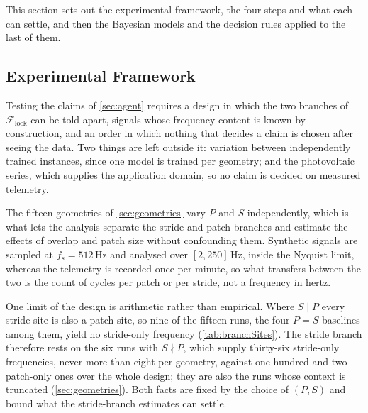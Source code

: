 This section sets out the experimental framework, the four steps and what each can settle, and then the Bayesian models and the decision rules applied to the last of them.

\subsection{Experimental Framework}\label{sec:framework}
\begingroup
\let\subsubsection\paragraph%
\let\subsection\subsubsection%
Testing the claims of \autoref{sec:agent} requires a design in which the two branches of $\mathcal F_{\mathrm{lock}}$ can be told apart, signals whose frequency content is known by construction, and an order in which nothing that decides a claim is chosen after seeing the data. Two things are left outside it: variation between independently trained instances, since one model is trained per geometry; and the photovoltaic series, which supplies the application domain, so no claim is decided on measured telemetry.



The fifteen geometries of \autoref{sec:geometries} vary $P$ and $S$ independently, which is what lets the analysis separate the stride and patch branches and estimate the effects of overlap and patch size without confounding them. Synthetic signals are sampled at $f_s=512$\,Hz and analysed over $[2,250]$\,Hz, inside the Nyquist limit, whereas the telemetry is recorded once per minute, so what transfers between the two is the count of cycles per patch or per stride, not a frequency in hertz.

One limit of the design is arithmetic rather than empirical. Where $S \mid P$ every stride site is also a patch site, so nine of the fifteen runs, the four $P=S$ baselines among them, yield no stride-only frequency (\autoref{tab:branchSites}). The stride branch therefore rests on the six runs with $S \nmid P$, which supply thirty-six stride-only frequencies, never more than eight per geometry, against one hundred and two patch-only ones over the whole design; they are also the runs whose context is truncated (\autoref{sec:geometries}). Both facts are fixed by the choice of $(P,S)$ and bound what the stride-branch estimates can settle.

